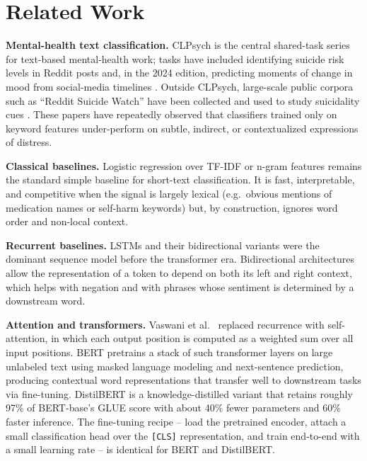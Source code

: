 \documentclass[12pt]{article}
\begin{document}
\section{Related Work}

\textbf{Mental-health text classification.} CLPsych
\cite{coppersmith2015clpsych} is the central shared-task series for
text-based mental-health work; tasks have included identifying suicide
risk levels in Reddit posts \cite{shing2018expert} and, in the 2024
edition, predicting moments of change in mood from social-media
timelines \cite{clpsych2024shared}. Outside CLPsych, large-scale public
corpora such as ``Reddit Suicide Watch'' have been collected and used
to study suicidality cues \cite{cohan2018smhd, ji2022suicidal}. These
papers have repeatedly observed that classifiers trained only on
keyword features under-perform on subtle, indirect, or contextualized
expressions of distress.

\textbf{Classical baselines.} Logistic regression over TF-IDF or
n-gram features remains the standard simple baseline for short-text
classification. It is fast, interpretable, and competitive when the
signal is largely lexical (e.g.\ obvious mentions of medication names
or self-harm keywords) but, by construction, ignores word order and
non-local context.

\textbf{Recurrent baselines.} LSTMs \cite{hochreiter1997lstm} and their
bidirectional variants \cite{schuster1997bilstm} were the dominant
sequence model before the transformer era. Bidirectional architectures
allow the representation of a token to depend on both its left and
right context, which helps with negation and with phrases whose
sentiment is determined by a downstream word.

\textbf{Attention and transformers.} Vaswani et al.\
\cite{vaswani2017attention} replaced recurrence with self-attention,
in which each output position is computed as a weighted sum over all
input positions. BERT \cite{devlin2019bert} pretrains a stack of such
transformer layers on large unlabeled text using masked language
modeling and next-sentence prediction, producing contextual word
representations that transfer well to downstream tasks via
fine-tuning. DistilBERT \cite{sanh2019distilbert} is a knowledge-distilled
variant that retains roughly 97\% of BERT-base's GLUE score with about
40\% fewer parameters and 60\% faster inference. The fine-tuning
recipe -- load the pretrained encoder, attach a small classification
head over the \texttt{[CLS]} representation, and train end-to-end with
a small learning rate -- is identical for BERT and DistilBERT.
\end{document}
